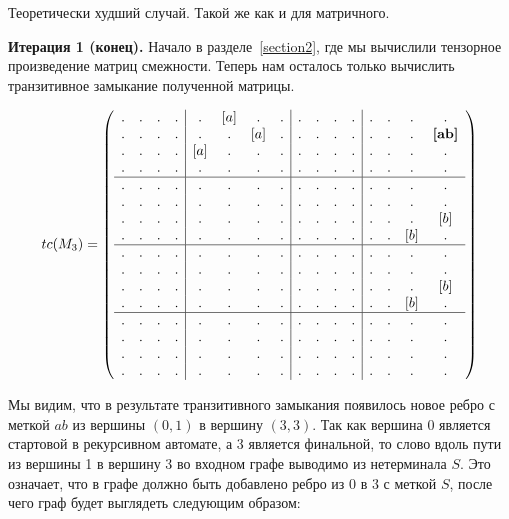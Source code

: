 \begin{example}
\label{algorithm_example}
Теоретически худший случай.
Такой же как и для матричного.

\textbf{Итерация 1 (конец).} Начало в разделе~\ref{section2}, где мы вычислили тензорное произведение матриц смежности.
Теперь нам осталось только вычислить транзитивное замыкание полученной матрицы.
 
\begin{align}
tc(M_3) =
\left(\begin{array}{c c c c | c c c c | c c c c | c c c c } 
. & . & . & .  &  . & [a] & . & .  &  . & . & . & .  &  . & . & . & .\\
. & . & . & .  &  . & . & [a] & .  &  . & . & . & .  &  . & . & . & \textbf{[ab]}   \\
. & . & . & .  &  [a] & . & . & .  &  . & . & . & .  &  . & . & . & .   \\
. & . & . & .  &  . & . & . & .    &  . & . & . & .  &  . & . & . & .   \\
\hline
. & . & . & .  &  . & . & . & .    &  . & . & . & .  &  . & . & . & .   \\
. & . & . & .  &  . & . & . & .    &  . & . & . & .  &  . & . & . & .   \\
. & . & . & .  &  . & . & . & .    &  . & . & . & .  &  . & . & . & [b] \\
. & . & . & .  &  . & . & . & .    &  . & . & . & .  &  . & . & [b] & . \\
\hline
. & . & . & .  &  . & . & . & .    &  . & . & . & .  &  . & . & . & .   \\
. & . & . & .  &  . & . & . & .    &  . & . & . & .  &  . & . & . & .   \\
. & . & . & .  &  . & . & . & .    &  . & . & . & .  &  . & . & . & [b] \\
. & . & . & .  &  . & . & . & .    &  . & . & . & .  &  . & . & [b] & . \\
\hline
. & . & . & .  &  . & . & . & .    &  . & . & . & .  &  . & . & . & .   \\
. & . & . & .  &  . & . & . & .    &  . & . & . & .  &  . & . & . & .   \\
. & . & . & .  &  . & . & . & .    &  . & . & . & .  &  . & . & . & .   \\
. & . & . & .  &  . & . & . & .    &  . & . & . & .  &  . & . & . & . 
\end{array}\right)
\end{align}

Мы видим, что в результате транзитивного замыкания появилось новое ребро с меткой $ab$ из вершины $(0,1)$ в вершину $(3,3)$.
Так как вершина 0 является стартовой в рекурсивном автомате, а 3 является финальной, то слово вдоль пути из вершины 1 в вершину 3 во входном графе выводимо из нетерминала $S$.
Это означает, что в графе должно быть добавлено ребро из $0$ в $3$ с меткой $S$, после чего граф будет выглядеть следующим образом:


\end{example}
